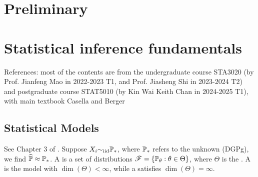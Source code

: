 \documentclass[10pt,a4paper]{book}
\begin{document}
	\MakeScribeTop
	\tableofcontents


\chapter{Preliminary}\label{chap:premi}


\chapter{Statistical inference fundamentals}\label{chap:stat-inf}

References: most of the contents are from the undergraduate course STA3020 (by Prof. Jianfeng Mao in 2022-2023 T1, and Prof. Jiasheng Shi in 2023-2024 T2) and postgraduate course STAT5010 (by Kin Wai Keith Chan in 2024-2025 T1), with main textbook Casella and Berger \cite{casella2002statistical} 


\section{Statistical Models}
See Chapter 3 of \cite{casella2002statistical}. Suppose $X_i{\sim}_{\mathrm{iid}} \mathbb P_*$, where $\mathbb P_*$ refers to the unknown  (DGPg), we find $\widehat{\mathbb P}\approx \mathbb P_*$. A  is a set of distributions $\mathscr{F}=\{\mathbb P_{\theta}:\theta\in\Theta\}$, where $\Theta$ is the . A  is the model with $\dim(\Theta)<\infty$, while a  satisfies $\dim(\Theta)=\infty$. 
\end{document}

